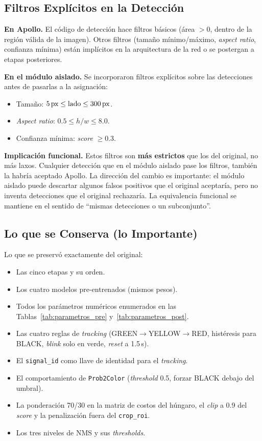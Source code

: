 \subsection{Filtros Explícitos en la Detección}

\textbf{En Apollo.} El código de detección hace filtros básicos (área $> 0$, dentro de la región válida de la imagen). Otros filtros (tamaño mínimo/máximo, \textit{aspect ratio}, confianza mínima) están implícitos en la arquitectura de la red o se postergan a etapas posteriores.

\textbf{En el módulo aislado.} Se incorporaron filtros explícitos sobre las detecciones antes de pasarlas a la asignación:

\begin{itemize}
    \item Tamaño: $5\text{\,px} \leq \text{lado} \leq 300\text{\,px}$.
    \item \textit{Aspect ratio}: $0.5 \leq h/w \leq 8.0$.
    \item Confianza mínima: \textit{score} $\geq 0.3$.
\end{itemize}

\textbf{Implicación funcional.} Estos filtros son \textbf{más estrictos} que los del original, no más laxos. Cualquier detección que en el módulo aislado pase los filtros, también la habría aceptado Apollo. La dirección del cambio es importante: el módulo aislado puede descartar algunos falsos positivos que el original aceptaría, pero no inventa detecciones que el original rechazaría. La equivalencia funcional se mantiene en el sentido de ``mismas detecciones o un subconjunto''.

\subsection{Lo que se Conserva (lo Importante)}

Lo que se preservó exactamente del original:

\begin{itemize}
    \item Las cinco etapas y su orden.
    \item Los cuatro modelos pre-entrenados (mismos pesos).
    \item Todos los parámetros numéricos enumerados en las Tablas~\ref{tab:parametros_pre} y~\ref{tab:parametros_post}.
    \item Las cuatro reglas de \textit{tracking} (GREEN$\to$YELLOW$\to$RED, histéresis para BLACK, \textit{blink} solo en verde, \textit{reset} a 1.5\,s).
    \item El \texttt{signal\_id} como llave de identidad para el \textit{tracking}.
    \item El comportamiento de \texttt{Prob2Color} (\textit{threshold} 0.5, forzar BLACK debajo del umbral).
    \item La ponderación 70/30 en la matriz de costos del húngaro, el \textit{clip} a 0.9 del \textit{score} y la penalización fuera del \texttt{crop\_roi}.
    \item Los tres niveles de NMS y sus \textit{thresholds}.
\end{itemize}


